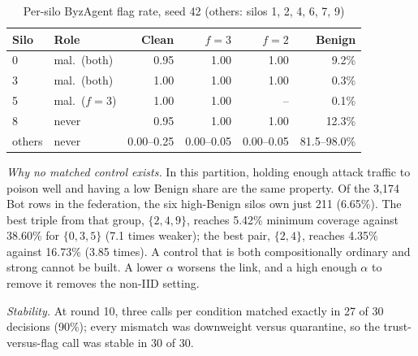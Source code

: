 \begin{table}[h]
\centering
\caption{Per-silo ByzAgent flag rate, seed 42 (others: silos 1, 2, 4, 6, 7, 9)} %
\label{tab:agentsilo}
\footnotesize
\setlength{\tabcolsep}{3pt}
\begin{tabular}{@{}llrrrr@{}}
\toprule
Silo & Role & Clean & $f=3$ & $f=2$ & Benign\\ %
\midrule
0 & mal.\ (both) & 0.95 & 1.00 & 1.00 & 9.2\%\\ %
3 & mal.\ (both) & 1.00 & 1.00 & 1.00 & 0.3\%\\ %
5 & mal.\ ($f=3$) & 1.00 & 1.00 & -- & 0.1\%\\ %
8 & never & 0.95 & 1.00 & 1.00 & 12.3\%\\ %
others & never & 0.00--0.25 & 0.00--0.05 & 0.00--0.05 & 81.5--98.0\%\\ %
\bottomrule
\end{tabular}
\end{table}

\emph{Why no matched control exists.} In this partition, holding enough attack traffic
to poison well and having a low Benign share are the same property. Of the 3,174 Bot %
rows in the federation, the six high-Benign silos own just 211 (6.65\%). %
The best triple %
from that group, $\{2,4,9\}$, reaches 5.42\% minimum coverage against 38.60\% for %
$\{0,3,5\}$ (7.1 times weaker); the best pair, $\{2,4\}$, reaches 4.35\% against 16.73\% %
(3.85 times). A control that is both compositionally ordinary and strong cannot be built. %
A lower $\alpha$ worsens the link, and a high enough $\alpha$ to remove it removes the
non-IID setting.

\emph{Stability.} At round 10, three calls per condition matched exactly in 27 of 30 %
decisions (90\%); every mismatch was downweight versus quarantine, so the trust-versus-flag %
call was stable in 30 of 30. %

